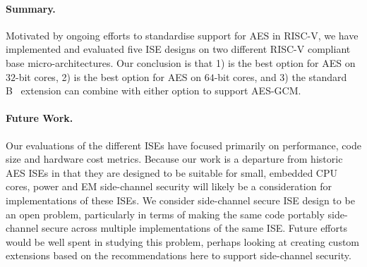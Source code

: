 

\paragraph{Summary.}
Motivated by ongoing efforts to standardise support 
for AES in RISC-V, we have implemented and evaluated five ISE designs 
on two different RISC-V compliant base micro-architectures.
Our conclusion is that
1) 
   is the best option for 
   AES on $32$-bit cores,
2) 
   is the best option for 
   AES on $64$-bit cores,
   and
3) the
   standard 
   B~\cite[Section 17]{RV:ISA:I:19}
   extension
   can combine with either option to support AES-GCM.

\paragraph{Future Work.}
Our evaluations of the different ISEs have focused primarily on
performance, code size and hardware cost metrics.
Because our work is a departure from historic
AES ISEs in that they are designed to be suitable for small, embedded
CPU cores, power and EM side-channel security will likely be a consideration
for implementations of these ISEs.
We consider side-channel secure ISE design to be an
open problem, particularly in terms of making the same code portably
side-channel secure across multiple implementations of the same ISE.
Future efforts would be well spent in studying this problem, perhaps
looking at creating custom extensions based on the recommendations here
to support side-channel security.

%


